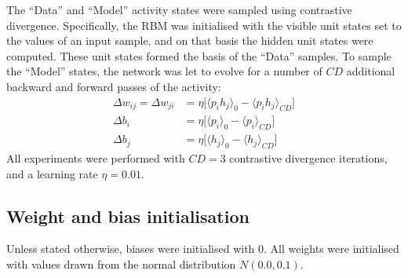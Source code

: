 \documentclass[11pt]{article}
\begin{document}
The ``Data'' and ``Model'' activity states were sampled using contrastive
divergence. Specifically, the RBM was initialised with the visible
unit states set to the values of an input sample, and on that basis
the hidden unit states were computed. These unit states formed the
basis of the ``Data'' samples. To sample the ``Model'' states, the network
was let to evolve for a number of $CD$ additional backward and forward
passes of the activity:
\begin{align}
  \label{eq:cd_update_equations}
  \Delta w_{ij} = \Delta w_{ji} &= \eta \Big[\langle p_{i}h_{j} \rangle_{0} - \langle p_{i}h_{j} \rangle_{CD}\Big] \\
  \Delta b_{i}                  &= \eta \Big[\langle p_{i}      \rangle_{0} - \langle p_{i}      \rangle_{CD}\Big] \\
  \Delta b_{j}                  &= \eta \Big[\langle h_{j}      \rangle_{0} - \langle h_{j}      \rangle_{CD}\Big]
\end{align}
All experiments were performed with $CD=3$ contrastive divergence
iterations, and a learning rate $\eta = 0.01$.




\subsection{Weight and bias initialisation}

Unless stated otherwise, biases were initialised with 0. All weights
were initialised with values drawn from the normal distribution
$N(0.0, 0.1)$.
\end{document}
